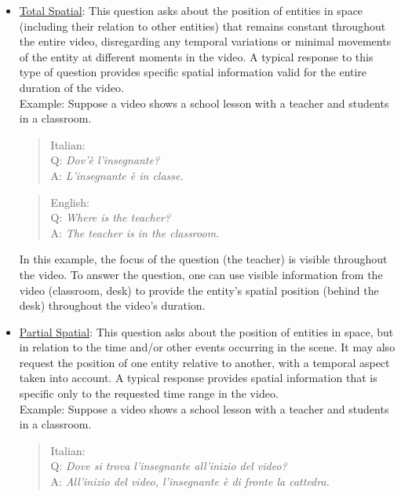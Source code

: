 \begin{itemize}
    \item \underline{Total Spatial}: This question asks about the position of entities in space (including their relation to other entities) that remains constant throughout the entire video, disregarding any temporal variations or minimal movements of the entity at different moments in the video. A typical response to this type of question provides specific spatial information valid for the entire duration of the video.\\
    Example: Suppose a video shows a school lesson with a teacher and students in a classroom.

    \begin{quote}
        Italian:\\
Q: \textit{Dov'è l'insegnante?}\\
A: \textit{L'insegnante è in classe.}\\
    \end{quote}

    
    \begin{quote}
        English:\\
Q: \textit{Where is the teacher?}\\
A: \textit{The teacher is in the classroom.}\\
    \end{quote}
In this example, the focus of the question (the teacher) is visible throughout the video. To answer the question, one can use visible information from the video (classroom, desk) to provide the entity’s spatial position (behind the desk) throughout the video’s duration.

    \item \underline{Partial Spatial}: This question asks about the position of entities in space, but in relation to the time and/or other events occurring in the scene. It may also request the position of one entity relative to another, with a temporal aspect taken into account. A typical response provides spatial information that is specific only to the requested time range in the video.\\
    Example: Suppose a video shows a school lesson with a teacher and students in a classroom.

    \begin{quote}
       Italian:\\
Q: \textit{Dove si trova l'insegnante all'inizio del video?}\\
A: \textit{All'inizio del video, l'insegnante è di fronte la cattedra.}\\
    \end{quote}
    

\end{itemize}
